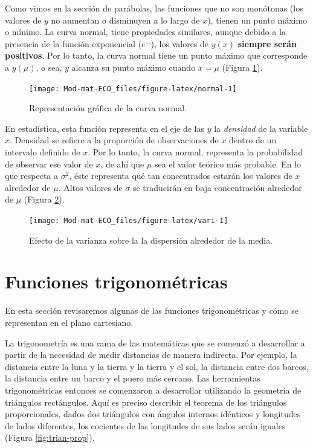 \documentclass[
]{book}
\begin{document}
Como vimos en la sección de parábolas, las funciones que no son monótonas (los valores de \(y\) no aumentan o disminuyen a lo largo de \(x\)), tienen un punto máximo o mínimo. La curva normal, tiene propiedades similares, aunque debido a la presencia de la función exponencial (\(e^{\dots}\)), los valores de \(y(x)\) \textbf{siempre serán positivos}. Por lo tanto, la curva normal tiene un punto máximo que corresponde a \(y(\mu)\), o sea, \(y\) alcanza su punto máximo cuando \(x=\mu\) (Figura \ref{fig:normal}).

\begin{figure}

{\centering \texttt{[image: Mod-mat-ECO\_files/figure-latex/normal-1]} 

}

\caption{Representación gráfica de la curva normal.}\label{fig:normal}
\end{figure}

En estadística, esta función representa en el eje de las \(y\) la \emph{densidad} de la variable \(x\). Densidad se refiere a la proporción de observaciones de \(x\) dentro de un intervalo definido de \(x\). Por lo tanto, la curva normal, representa la probabilidad de observar ese valor de \(x\), de ahí que \(\mu\) sea el valor teórico más probable. En lo que respecta a \(\sigma^2\), éste representa qué tan concentrados estarán los valores de \(x\) alrededor de \(\mu\). Altos valores de \(\sigma\) se traducirán en baja concentración alrededor de \(\mu\) (Figura \ref{fig:vari}).

\begin{figure}

{\centering \texttt{[image: Mod-mat-ECO\_files/figure-latex/vari-1]} 

}

\caption{Efecto de  la varianza sobre la la dispersión alrededor de la media.}\label{fig:vari}
\end{figure}

\hypertarget{funciones-trigonomuxe9tricas}{%
\section{Funciones trigonométricas}\label{funciones-trigonomuxe9tricas}}

En esta sección revisaremos algunas de las funciones trigonométricas y cómo se representan en el plano cartesiano.

La trigonometría es una rama de las matemáticas que se comenzó a desarrollar a partir de la necesidad de medir distancias de manera indirecta. Por ejemplo, la distancia entre la luna y la tierra y la tierra y el sol, la distancia entre dos barcos, la distancia entre un barco y el puero más cercano. Las herramientas trigonométricas entonces se comenzaron a desarrollar utilizando la geometría de triángulos rectángulos. Aquí es preciso describir el teorema de los triángulos proporcionales, dados dos triángulos con ángulos internos idénticos y longitudes de lados diferentes, los cocientes de las longitudes de sus lados serán iguales (Figura \ref{fig:trian-prop}).
\end{document}
